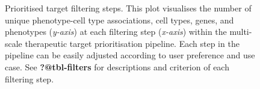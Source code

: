 \documentclass[
]{report}
\begin{document}
\newpage{}

\begin{figure}[H]


\caption{\label{fig-therapy-filterD08295A6-16DC-499D-85A8-8BA656E013A2}Prioritised
target filtering steps. This plot visualises the number of unique
phenotype-cell type associations, cell types, genes, and phenotypes
(\emph{y-axis}) at each filtering step (\emph{x-axis}) within the
multi-scale therapeutic target prioritisation pipeline. Each step in the
pipeline can be easily adjusted according to user preference and use
case. See \textbf{?@tbl-filters} for descriptions and criterion of each
filtering step.}

\end{figure}%

\newpage{}
\end{document}
